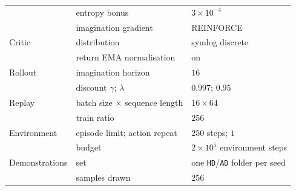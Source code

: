 \begin{table}[t]
\begin{tabular}{lll}
             & entropy bonus & $3\times10^{-4}$ \\
             & imagination gradient & REINFORCE \\
Critic       & distribution & symlog discrete \\
             & return EMA normalisation & on \\
Rollout      & imagination horizon & $16$ \\
             & discount $\gamma$; $\lambda$ & $0.997$; $0.95$ \\
Replay       & batch size $\times$ sequence length & $16 \times 64$ \\
             & train ratio & $256$ \\
Environment  & episode limit; action repeat & $250$ steps; $1$ \\
             & budget & $2\times10^{5}$ environment steps \\
Demonstrations & set & one \texttt{HD}/\texttt{AD} folder per seed \\
             & samples drawn & $256$ \\
\bottomrule
\end{tabular}
\end{table}
